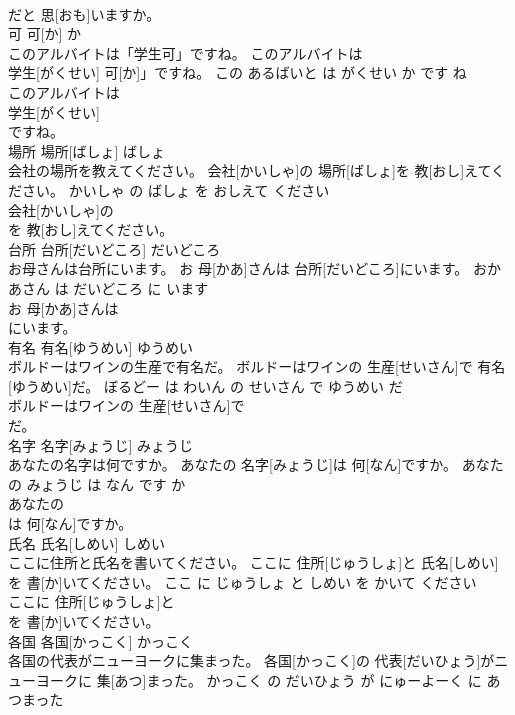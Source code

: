 \documentclass[8pt]{extreport}
\begin{document}
\begin{CJK}{UTF8}{min}
\\	だと 思[おも]いますか。			
\\	可	可[か]	か	
\\	このアルバイトは「学生可」ですね。	このアルバイトは
\\	学生[がくせい] 可[か]」ですね。	この あるばいと は がくせい か です ね	
\\	このアルバイトは
\\	学生[がくせい]
\\	ですね。			
\\	場所	場所[ばしょ]	ばしょ	
\\	会社の場所を教えてください。	会社[かいしゃ]の 場所[ばしょ]を 教[おし]えてください。	かいしゃ の ばしょ を おしえて ください	
\\	会社[かいしゃ]の
\\	を 教[おし]えてください。			
\\	台所	台所[だいどころ]	だいどころ	
\\	お母さんは台所にいます。	お 母[かあ]さんは 台所[だいどころ]にいます。	おかあさん は だいどころ に います	
\\	お 母[かあ]さんは
\\	にいます。			
\\	有名	有名[ゆうめい]	ゆうめい	
\\	ボルドーはワインの生産で有名だ。	ボルドーはワインの 生産[せいさん]で 有名[ゆうめい]だ。	ぼるどー は わいん の せいさん で ゆうめい だ	
\\	ボルドーはワインの 生産[せいさん]で
\\	だ。			
\\	名字	名字[みょうじ]	みょうじ	
\\	あなたの名字は何ですか。	あなたの 名字[みょうじ]は 何[なん]ですか。	あなた の みょうじ は なん です か	
\\	あなたの
\\	は 何[なん]ですか。			
\\	氏名	氏名[しめい]	しめい	
\\	ここに住所と氏名を書いてください。	ここに 住所[じゅうしょ]と 氏名[しめい]を 書[か]いてください。	ここ に じゅうしょ と しめい を かいて ください	
\\	ここに 住所[じゅうしょ]と
\\	を 書[か]いてください。			
\\	各国	各国[かっこく]	かっこく	
\\	各国の代表がニューヨークに集まった。	各国[かっこく]の 代表[だいひょう]がニューヨークに 集[あつ]まった。	かっこく の だいひょう が にゅーよーく に あつまった	

\end{CJK}
\end{document}
